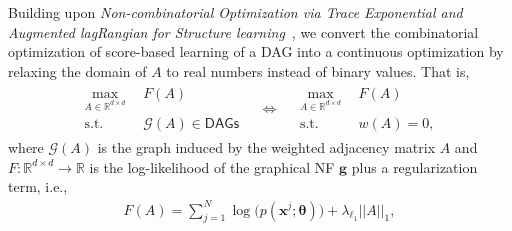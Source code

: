 Building upon \textit{Non-combinatorial Optimization via Trace Exponential and Augmented lagRangian for
Structure learning}~\citep[NO TEARS, ][]{DAG-1}, we convert the combinatorial optimization of score-based learning of a DAG into a continuous optimization by relaxing the domain of $A$ to real numbers instead of binary values. That is,
\begin{align}\label{eq:DAG-relax}
\begin{aligned}
\max_{A\in\mathbb{R}^{d\times d}} & \ \ F(A) \\
\text{s.t.} & \ \ \mathcal{G}(A) \in \mathsf{DAGs}
\end{aligned}
\quad \iff \quad
\begin{aligned}
\max_{A\in\mathbb{R}^{d\times d}} & \ \  F(A) \\
\text{s.t.} & \ \ w(A) = 0,
\end{aligned}
\end{align}
where $\mathcal{G}(A)$ is the graph induced by the weighted adjacency matrix $A$ and $F: \mathbb{R}^{d \times d}\rightarrow \mathbb{R}$ is the log-likelihood of the graphical NF $\mathbf{g}$ plus a regularization term, i.e.,
\begin{align}
     F(A) = \sum^N_{j=1}\log\big(p(\mathbf{x}^j; \mathbf{\theta})\big) + \lambda_{\ell_1} ||A||_1, \label{eq:score}
\end{align}

